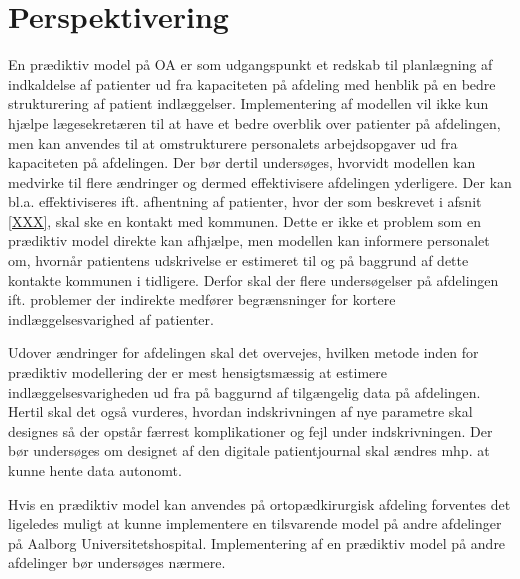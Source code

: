 \section{Perspektivering} 
En prædiktiv model på OA er som udgangspunkt et redskab til planlægning af indkaldelse af patienter ud fra kapaciteten på afdeling med henblik på en bedre strukturering af patient indlæggelser. Implementering af modellen vil ikke kun hjælpe lægesekretæren til at have et bedre overblik over patienter på afdelingen, men kan anvendes til at omstrukturere personalets arbejdsopgaver ud fra kapaciteten på afdelingen. Der bør dertil undersøges, hvorvidt modellen kan medvirke til flere ændringer og dermed effektivisere afdelingen yderligere. Der kan bl.a. effektiviseres ift. afhentning af patienter, hvor der som beskrevet i afsnit \ref{XXX}, skal ske en kontakt med kommunen. Dette er ikke et problem som en prædiktiv model direkte kan afhjælpe, men modellen kan informere personalet om, hvornår patientens udskrivelse er estimeret til og på baggrund af dette kontakte kommunen i tidligere. Derfor skal der flere undersøgelser på afdelingen ift. problemer der indirekte medfører begrænsninger for kortere indlæggelsesvarighed af patienter. 


Udover ændringer for afdelingen skal det overvejes, hvilken metode inden for prædiktiv modellering der er mest hensigtsmæssig at estimere indlæggelsesvarigheden ud fra på baggurnd af tilgængelig data på afdelingen. Hertil skal det også vurderes, hvordan indskrivningen af nye parametre skal designes så der opstår færrest komplikationer og fejl under indskrivningen. Der bør undersøges om designet af den digitale patientjournal skal ændres mhp. at kunne hente data autonomt. 


Hvis en prædiktiv model kan anvendes på ortopædkirurgisk afdeling forventes det ligeledes muligt at kunne implementere en tilsvarende model på andre afdelinger på Aalborg Universitetshospital. Implementering af en prædiktiv model på andre afdelinger bør undersøges nærmere. 
